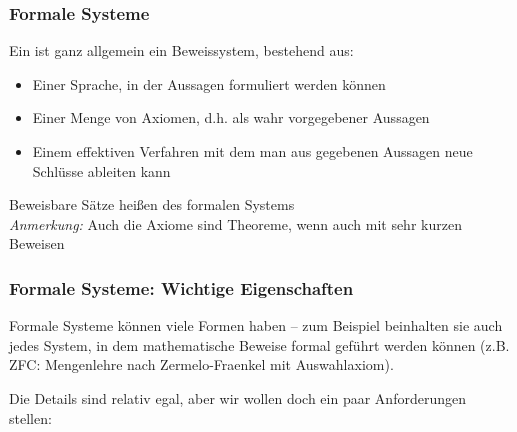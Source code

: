 \documentclass[onlymath]{beamer}
\begin{document}
\begin{frame}\frametitle{Formale Systeme}

Ein  ist ganz allgemein ein Beweissystem, bestehend aus:
\begin{itemize}
\item Einer Sprache, in der Aussagen formuliert werden können
\item Einer Menge von Axiomen, d.h. als wahr vorgegebener Aussagen
\item Einem effektiven Verfahren mit dem man aus gegebenen Aussagen neue Schlüsse ableiten kann
\end{itemize}
Beweisbare Sätze heißen  des formalen Systems\\
{\tiny {\emph{Anmerkung:} Auch die Axiome sind Theoreme, wenn auch mit sehr kurzen Beweisen}}
\medskip\pause




\end{frame}


\begin{frame}\frametitle{Formale Systeme: Wichtige Eigenschaften}

Formale Systeme können viele Formen haben -- zum Beispiel beinhalten sie auch jedes System, in dem mathematische Beweise formal geführt werden können (z.B. ZFC: Mengenlehre nach Zermelo-Fraenkel mit Auswahlaxiom).\bigskip\pause

Die Details sind relativ egal, aber
wir wollen doch ein paar Anforderungen stellen:



\end{frame}
\end{document}
